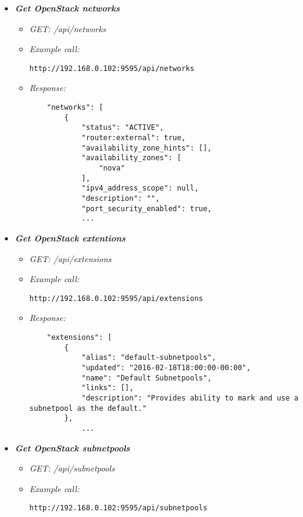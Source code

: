 \begin{itemize}

\item \textbf{\textit{Get OpenStack networks}}
\begin{itemize}
\item \emph{GET: /api/networks}
\item \emph{Example call:}
 \begin{lstlisting}
http://192.168.0.102:9595/api/networks
\end{lstlisting}

\item \emph{Response:}
 \begin{lstlisting}
    "networks": [
        {
            "status": "ACTIVE",
            "router:external": true,
            "availability_zone_hints": [],
            "availability_zones": [
                "nova"
            ],
            "ipv4_address_scope": null,
            "description": "",
            "port_security_enabled": true,
            ...
\end{lstlisting}
\end{itemize}



\item \textbf{\textit{Get OpenStack extentions}}
\begin{itemize}
\item \emph{GET: /api/extensions}
\item \emph{Example call:}
 \begin{lstlisting}
http://192.168.0.102:9595/api/extensions
\end{lstlisting}

\item \emph{Response:}
 \begin{lstlisting}
    "extensions": [
        {
            "alias": "default-subnetpools",
            "updated": "2016-02-18T18:00:00-00:00",
            "name": "Default Subnetpools",
            "links": [],
            "description": "Provides ability to mark and use a subnetpool as the default."
        },
            ...
\end{lstlisting}
\end{itemize}


\item \textbf{\textit{Get OpenStack subnetpools}}
\begin{itemize}
\item \emph{GET: /api/subnetpools}
\item \emph{Example call:}
 \begin{lstlisting}
http://192.168.0.102:9595/api/subnetpools
\end{lstlisting}


\end{itemize}
\end{itemize}
